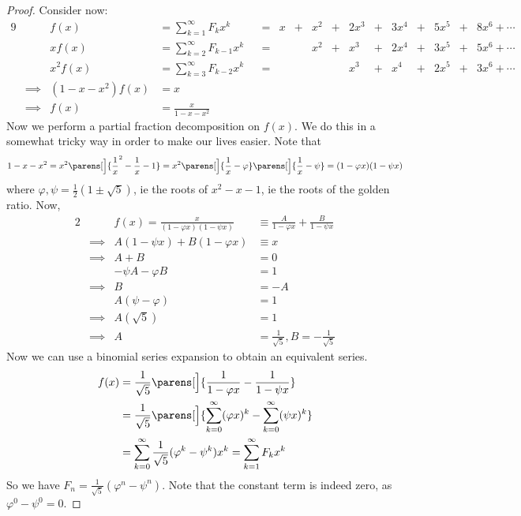 \begin{proof}
 Consider now:
 \begin{alignat*}9
  && f(x) &= \sum_{k = 1}^\infty F_k x^k
      &&={}& x &+{}& x^2 &+{}& 2x^3 &+{}&
          3x^4 &+{}& 5x^5 &+{}& 8x^6 + \dotsb \\
  && x f(x) &= \sum_{k = 2}^\infty F_{k - 1} x^k
      &&={}& &&x^2 &+{}& x^3 &+{}& 2x^4 &+{}&
          3x^5 &+{}& 5x^6 + \dotsb \\
  && x^2 f(x) &= \sum_{k = 3}^\infty F_{k - 2}x^k
      &&={}& &&&& x^3 &+{}& x^4 &+{}& 2x^5 &+{}& 3x^6 + \dotsb \\
  &\implies{}& (1 - x - x^2) f(x) &= x \\
  &\implies{}& f(x) &= \frac x{1 - x - x^2}
 \end{alignat*}
 Now we perform a partial fraction decomposition on \(f(x)\). We do this in a
 somewhat tricky way in order to make our lives easier. Note that
 \begin{equation*}
  1 - x - x^2 = x^2 \parens[\Big]{\frac 1x^2 - \frac 1x - 1}
      = x^2\parens[\Big]{\frac 1x - \varphi}\parens[\Big]{\frac 1x - \psi}
      = (1 - \varphi x)(1 - \psi x)
 \end{equation*}
 where \(\varphi, \psi = \frac 12(1 \pm \sqrt 5)\), ie the roots of
 \(x^2 - x - 1\), ie the roots of the golden ratio. Now,
 \begin{alignat*}2
  && f(x) = \frac x{(1 - \varphi x)(1 - \psi x)}
      &\equiv \frac A{1 - \varphi x} + \frac B{1 - \psi x} \\
  &\implies{}& A(1 - \psi x) + B(1 - \varphi x) &\equiv x \\
  &\implies{}& A + B &= 0 \\
  && -\psi A - \varphi B &= 1 \\
  &\implies{}& B &= -A  \\
  && A(\psi - \varphi) &= 1 \\
  &\implies{}& A(\sqrt 5) &= 1 \\
  &\implies{}& A &= \frac 1{\sqrt 5}, B = -\frac 1{\sqrt 5}
 \end{alignat*}
 Now we can use a binomial series expansion to obtain an equivalent series.
 \begin{align*}
  f(x) &= \frac 1{\sqrt 5}\parens[\Big]{\frac 1{1 - \varphi x}
                              - \frac 1{1 - \psi x}} \\
  &= \frac 1{\sqrt 5}\parens[\Big]{\sum_{k = 0}^\infty (\varphi x)^k
                      - \sum_{k = 0}^\infty (\psi x)^k} \\
  &= \sum_{k = 0}^\infty \frac 1{\sqrt 5}(\varphi^k - \psi^k)x^k
  = \sum_{k = 1}^\infty F_k x^k
 \end{align*}
 So we have \(F_n = \frac 1{\sqrt 5}(\varphi^n - \psi^n)\). Note that the
 constant term is indeed zero, as \(\varphi^0 - \psi^0 = 0\).
\end{proof}
